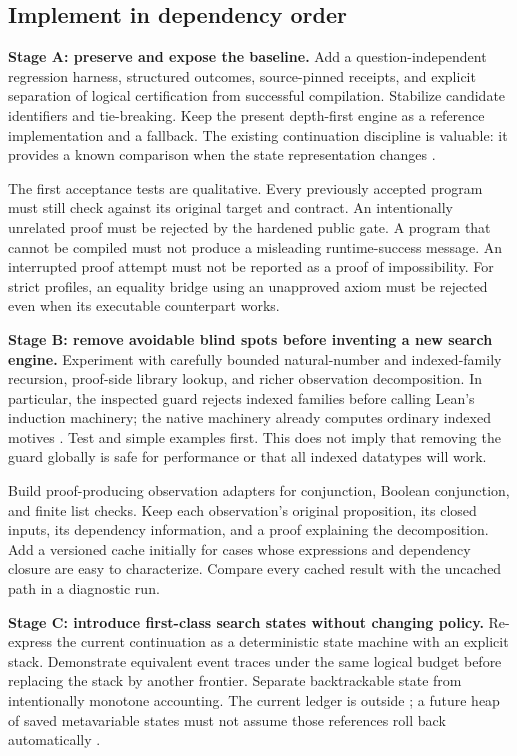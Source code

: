 \subsection{Implement in dependency order}

\textbf{Stage A: preserve and expose the baseline.} Add a question-independent regression harness, structured outcomes, source-pinned receipts, and explicit separation of logical certification from successful compilation. Stabilize candidate identifiers and tie-breaking. Keep the present depth-first engine as a reference implementation and a fallback. The existing continuation discipline is valuable: it provides a known comparison when the state representation changes \cite{searchcore,transaction,engine}.

The first acceptance tests are qualitative. Every previously accepted program must still check against its original target and contract. An intentionally unrelated proof must be rejected by the hardened public gate. A program that cannot be compiled must not produce a misleading runtime-success message. An interrupted proof attempt must not be reported as a proof of impossibility. For strict profiles, an equality bridge using an unapproved axiom must be rejected even when its executable counterpart works.

\textbf{Stage B: remove avoidable blind spots before inventing a new search engine.} Experiment with carefully bounded natural-number and indexed-family recursion, proof-side library lookup, and richer observation decomposition. In particular, the inspected  guard rejects indexed families before calling Lean's induction machinery; the native machinery already computes ordinary indexed motives \cite{searchcore,leaninduction}. Test  and simple  examples first. This does not imply that removing the guard globally is safe for performance or that all indexed datatypes will work.

Build proof-producing observation adapters for conjunction, Boolean conjunction, and finite list checks. Keep each observation's original proposition, its closed inputs, its dependency information, and a proof explaining the decomposition. Add a versioned cache initially for cases whose expressions and dependency closure are easy to characterize. Compare every cached result with the uncached path in a diagnostic run.

\textbf{Stage C: introduce first-class search states without changing policy.} Re-express the current continuation as a deterministic state machine with an explicit stack. Demonstrate equivalent event traces under the same logical budget before replacing the stack by another frontier. Separate backtrackable state from intentionally monotone accounting. The current  ledger is outside ; a future heap of saved metavariable states must not assume those references roll back automatically \cite{transaction}.

